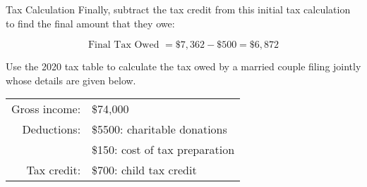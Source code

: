 \begin{example}{Tax Calculation}
Finally, subtract the tax credit from this initial tax calculation to find the final amount that they owe:

\[\textrm{Final Tax Owed } = \$7,362 - \$500 = \boxed{\$6,872}\]
\end{example}

\begin{try}
Use the 2020 tax table to calculate the tax owed by a married couple filing jointly whose details are given below.
\begin{center}
\begin{tabular}{r l}
Gross income: & \$74,000\\
Deductions: & \$5500: charitable donations\\
& \$150: cost of tax preparation\\
Tax credit: & \$700: child tax credit
\end{tabular}
\end{center}
\end{try}

